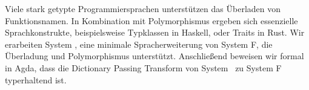 Viele stark getypte Programmiersprachen unterstützen das Überladen von Funktionsnamen. In Kombination mit Polymorphismus ergeben sich essenzielle Sprachkonstrukte, beispielsweise Typklassen in Haskell, oder Traits in Rust. Wir erarbeiten System \Fo, eine minimale Spracherweiterung von System F, die Überladung und Polymorphismus unterstützt. Anschließend beweisen wir formal in Agda, dass die Dictionary Passing Transform von System \Fo\ zu System F typerhaltend ist. 